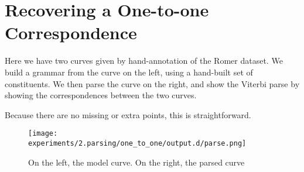 
\FloatBarrier

\section{Recovering a One-to-one Correspondence}

Here we have two curves given by hand-annotation of the Romer
dataset. We build a grammar from the curve on the left, using a
hand-built set of constituents. We then parse the curve on the right,
and show the Viterbi parse by showing the correspondences between the
two curves.

Because there are no missing or extra points, this is straightforward.

\begin{figure}
\texttt{[image: experiments/2.parsing/one\_to\_one/output.d/parse.png]}
\caption[Recovering a One-to-one Correspondence]{On the left, the model curve. On the right, the parsed curve}
\end{figure}
